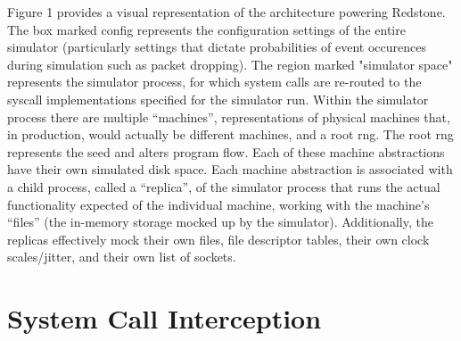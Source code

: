{\fontsize{12}{15}\selectfont 
Figure 1 provides a visual representation of the architecture powering Redstone.
The box marked config represents the configuration settings of the entire simulator (particularly settings that dictate probabilities of event occurences during simulation such as packet dropping). The region marked "simulator space" represents the simulator process,
for which system calls are re-routed to the syscall implementations specified for the simulator run.
Within the simulator process there are multiple “machines”,
representations of physical machines that, in production, would actually be different machines, and a root rng. The root rng represents the seed and alters program flow.
Each of these machine abstractions have their own simulated disk space.
Each machine abstraction is associated with a child process,
called a “replica”,
of the simulator process that runs the actual functionality expected of the individual machine,
working with the machine’s “files” (the in-memory storage mocked up by the simulator). Additionally, the replicas effectively mock their own files, file descriptor tables, their own clock scales/jitter, and their own list of sockets.

}

\section{\txtrsdust System Call Interception}

